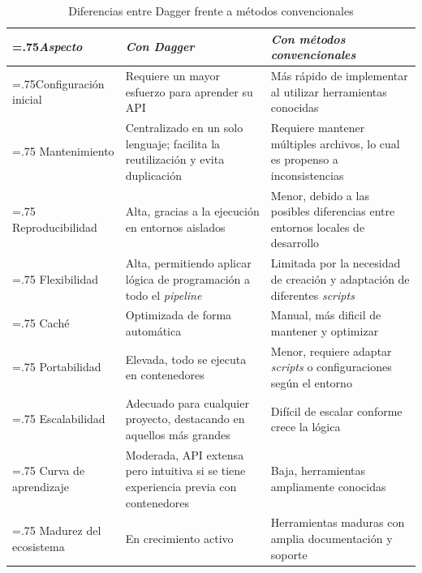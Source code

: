 \begin{table}[htbp]
  \begin{tabularx}{\textwidth}{|>{\hsize=.75\hsize}X|X|>{\hsize=1.25\hsize}X|}
    \hline
    \textit{Aspecto} & \textit{Con Dagger} & \textit{Con métodos convencionales} \\ \hline
    Configuración inicial & Requiere un mayor esfuerzo para aprender su API & Más rápido de implementar al utilizar herramientas conocidas \\ \hline
    Mantenimiento & Centralizado en un solo lenguaje; facilita la reutilización y evita duplicación & Requiere mantener múltiples archivos, lo cual es propenso a inconsistencias \\ \hline
    Reproducibilidad & Alta, gracias a la ejecución en entornos aislados & Menor, debido a las posibles diferencias entre entornos locales de desarrollo \\ \hline
    Flexibilidad & Alta, permitiendo aplicar lógica de programación a todo el \textit{pipeline} & Limitada por la necesidad de creación y adaptación de diferentes \textit{scripts} \\ \hline
    Caché & Optimizada de forma automática & Manual, más dificil de mantener y optimizar \\ \hline
    Portabilidad & Elevada, todo se ejecuta en contenedores & Menor, requiere adaptar \textit{scripts} o configuraciones según el entorno \\ \hline
    Escalabilidad & Adecuado para cualquier proyecto, destacando en aquellos más grandes & Difícil de escalar conforme crece la lógica \\ \hline
    Curva de aprendizaje & Moderada, API extensa pero intuitiva si se tiene experiencia previa con contenedores & Baja, herramientas ampliamente conocidas \\ \hline
    Madurez del ecosistema & En crecimiento activo & Herramientas maduras con amplia documentación y soporte \\ \hline
  \end{tabularx}
  \caption{Diferencias entre Dagger frente a métodos convencionales}
  \label{table:differences}
\end{table}
